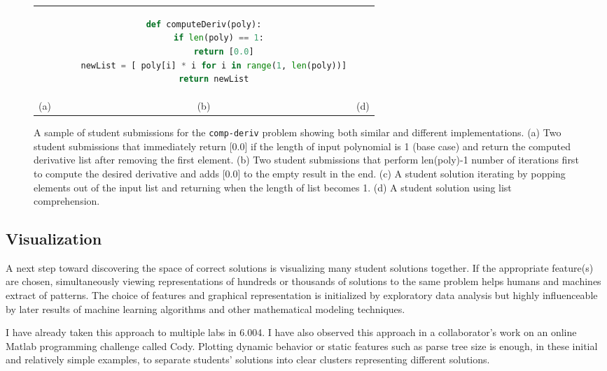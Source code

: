 \documentclass[12pt]{article}
\newcommand\codevar[1]{\texttt{#1}}
\begin{document}
\begin{figure}[!htpb]
\begin{tabular}{c|c|c}
&
\begin{minipage}{.32\linewidth}
\begin{lstlisting}[language=python]
def computeDeriv(poly):
      if len(poly) == 1:
        return [0.0]
    newList = [ poly[i] * i for i in range(1, len(poly))]
    return newList
\end{lstlisting}
\end{minipage}
\\
(a) & (b) & (d)
\end{tabular}
\caption{A sample of student submissions for the \codevar{comp-deriv} problem showing both similar and different implementations. (a) Two student submissions that immediately return [0.0] if the length of input polynomial is 1 (base case) and return the computed derivative list after removing the first element. (b) Two student submissions that perform len(poly)-1 number of iterations first to compute the desired derivative and adds [0.0] to the empty result in the end. (c) A student solution iterating by popping elements out of the input list and returning when the length of list becomes 1. (d) A student solution using list comprehension.}
\label{comp-deriv-diff-attempts}
\end{figure}


\subsection{Visualization}

A next step toward discovering the space of correct solutions is visualizing many student solutions together. If the appropriate feature(s) are chosen, simultaneously viewing representations of hundreds or thousands of solutions to the same problem helps humans and machines extract of patterns. The choice of features and graphical representation is initialized by exploratory data analysis but highly influenceable by later results of machine learning algorithms and other mathematical modeling techniques. 

I have already taken this approach to multiple labs in 6.004. I have also observed this approach in a collaborator's work on an online Matlab programming challenge called Cody. Plotting dynamic behavior or static features such as parse tree size is enough, in these initial and relatively simple examples, to separate students' solutions into clear clusters representing different solutions. %
\end{document}

